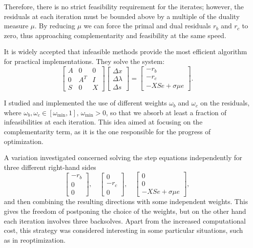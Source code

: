 Therefore, there is no strict feasibility requirement for 
the iterates; however, the residuals at each iteration must be 
bounded above by a multiple of the duality measure $\mu$. 
By reducing $\mu$ we can force the primal and dual residuals 
$r_b$ and $r_c$ to zero, thus approaching complementarity and 
feasibility at the same speed.

It is widely accepted that infeasible methods provide the most 
efficient algorithm for practical implementations. They solve the system:
\[
\left[ \begin{array}{ccc}
    A & 0 & 0 \\ 0 &A^T & I \\ S & 0 & X
  \end{array} \right]
\left[ \begin{array}{c}
    \Delta x \\ \Delta \lambda \\ \Delta s
  \end{array} \right] = 
\left[ \begin{array}{c}
    -r_b \\ -r_c \\ -XSe + \sigma\mu e
  \end{array} \right].
\]

I studied and implemented the use of different weights $\omega_b$ 
and $\omega_c$ on the residuals, where 
$\omega_b, \omega_c \in [ \omega_{\min}, 1]$, $\omega_{\min}>0$, 
so that we absorb at least a fraction of infeasibilities at each 
iteration. This idea aimed at focusing on the complementarity term, 
as it is the one responsible for the progress of optimization.

A variation investigated concerned solving the step equations 
independently for three different right-hand sides
\[
\left[ \begin{array}{c}
    -r_b \\ 0 \\ 0 
  \end{array} \right], \quad
\left[ \begin{array}{c}
    0 \\ -r_c \\ 0 
  \end{array} \right], \quad
\left[ \begin{array}{c}
    0 \\ 0  \\ -XSe + \sigma\mu e
  \end{array} \right],
\]
and then combining the resulting directions with some independent 
weights. This gives the freedom of postponing the choice of the 
weights, but on the other hand each iteration involves three 
backsolves. Apart from the increased computational cost, this 
strategy was considered interesting in some particular situations, 
such as in reoptimization.

